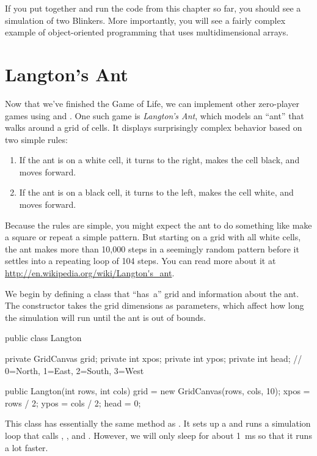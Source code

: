 If you put together and run the code from this chapter so far, you should see a simulation of two Blinkers.
More importantly, you will see a fairly complex example of object-oriented programming that uses multidimensional arrays.


\section{Langton's Ant}

Now that we've finished the Game of Life, we can implement other zero-player games using  and .
One such game is {\it Langton's Ant}, which models an ``ant'' that walks around a grid of cells.
It displays surprisingly complex behavior based on two simple rules:

\begin{enumerate}
\item If the ant is on a white cell, it turns to the right, makes the cell black, and moves forward.
\item If the ant is on a black cell, it turns to the left, makes the cell white, and moves forward.
\end{enumerate}

Because the rules are simple, you might expect the ant to do something like make a square or repeat a simple pattern.
But starting on a grid with all white cells, the ant makes more than 10,000 steps in a seemingly random pattern before it settles into a repeating loop of 104 steps.
You can read more about it at \url{http://en.wikipedia.org/wiki/Langton's_ant}.

We begin by defining a  class that ``has~a'' grid and information about the ant.
The constructor takes the grid dimensions as parameters, which affect how long the simulation will run until the ant is out of bounds.

\begin{code}
public class Langton {
    private GridCanvas grid;
    private int xpos;
    private int ypos;
    private int head; // 0=North, 1=East, 2=South, 3=West

    public Langton(int rows, int cols) {
        grid = new GridCanvas(rows, cols, 10);
        xpos = rows / 2;
        ypos = cols / 2;
        head = 0;
    }
}
\end{code}

This class has essentially the same  method as .
It sets up a  and runs a simulation loop that calls , , and .
However, we will only sleep for about 1~ms so that it runs a lot faster.

